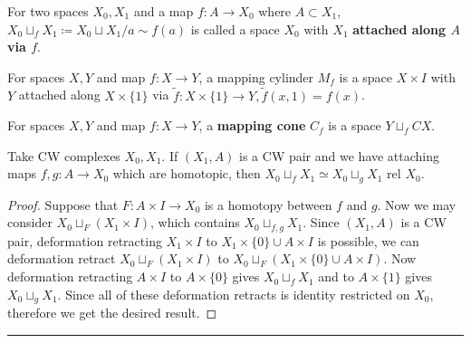 \begin{defn} For two spaces $X_0, X_1$ and a map $f:A\rightarrow X_0$ where $A\subset X_1$, $X_0\sqcup_{f} X_1\coloneqq X_0\sqcup X_1/a\sim f(a)$ is called a space $X_0$ with $X_1$ \textbf{attached along $A$ via $f$}.
\end{defn}
\begin{exmp} For spaces $X,Y$ and map $f:X\rightarrow Y$, a mapping cylinder $M_f$ is a space $X\times I$ with $Y$ attached along $X\times \{1\}$ via $\tilde{f}:X\times \{1\}\rightarrow Y, \tilde{f}(x,1)=f(x)$.
\end{exmp}

\begin{exmp} For spaces $X,Y$ and map $f:X\rightarrow Y$, a \textbf{mapping cone} $C_f$ is a space $Y\sqcup_f CX$.
\end{exmp}

\begin{prop} Take CW complexes $X_0,X_1$. If $(X_1,A)$ is a CW pair and we have attaching maps $f,g:A\rightarrow X_0$ which are homotopic, then $X_0\sqcup_f X_1\simeq X_0\sqcup_g X_1 \textrm{ rel } X_0$.
\end{prop}
\begin{proof} Suppose that $F:A\times I\rightarrow X_0$ is a homotopy between $f$ and $g$. Now we may consider $X_0\sqcup_F(X_1\times I)$, which contains $X_0\sqcup_{f,g} X_1$. Since $(X_1,A)$ is a CW pair, deformation retracting $X_1\times I$ to $X_1\times\{0\}\cup A\times I$ is possible, we can deformation retract $X_0\sqcup_F(X_1\times I)$ to $X_0\sqcup_F (X_1\times \{0\}\cup A\times I)$. Now deformation retracting $A\times I$ to $A\times \{0\}$ gives $X_0\sqcup_f X_1$ and to $A\times \{1\}$ gives $X_0\sqcup_g X_1$. Since all of these deformation retracts is identity restricted on $X_0$, therefore we get the desired result.
\end{proof}
\noindent\rule{\textwidth}{1pt}
\newline